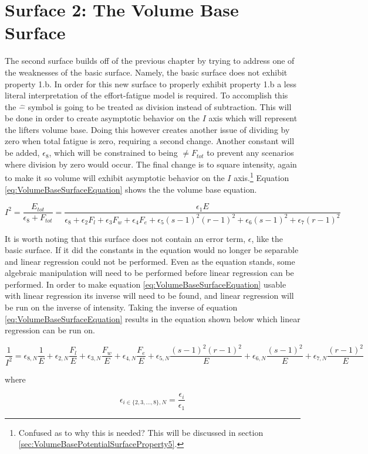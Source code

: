 \chapter{Surface 2: The Volume Base Surface}
\label{sec:PotentialSurfaceTheVolumeBaseSurface}

The second surface builds off of the previous chapter by trying to address one of the weaknesses of the basic surface. Namely, the basic surface does not exhibit property 1.b. In order for this new surface to properly exhibit property 1.b a less literal interpretation of the effort-fatigue model is required. To accomplish this the $\hat{-}$ symbol is going to be treated as division instead of subtraction. This will be done in order to create asymptotic behavior on the $I$ axis which will represent the lifters volume base. Doing this however creates another issue of dividing by zero when total fatigue is zero, requiring a second change. Another constant will be added, $\epsilon_8$, which will be constrained to being $\ne F_{tot}$ to prevent any scenarios where division by zero would occur. The final change is to square intensity, again to make it so volume will exhibit asymptotic behavior on the $I$ axis.\footnote{Confused as to why this is needed? This will be discussed in section \ref{sec:VolumeBasePotentialSurfaceProperty5}.} Equation \ref{eq:VolumeBaseSurfaceEquation} shows the the volume base equation.
 
\begin{equation}
	I^2 = \frac{E_{tot}}{\epsilon_8+F_{tot}}= \frac{
		\epsilon_1E
	}{
		\epsilon_8+
		\epsilon_2 F_l+
		\epsilon_3 F_w+
		\epsilon_4 F_e+
		\epsilon_5 (s-1)^2(r-1)^2+
		\epsilon_6 (s-1)^2+
		\epsilon_7 (r-1)^2
	}
	\label{eq:VolumeBaseSurfaceEquation}
\end{equation}

It is worth noting that this surface does not contain an error term, $\epsilon$, like the basic surface. If it did the constants in the equation would no longer be separable and linear regression could not be performed. Even as the equation stands, some algebraic manipulation will need to be performed before linear regression can be performed. In order to make equation \ref{eq:VolumeBaseSurfaceEquation} usable with linear regression its inverse will need to be found, and linear regression will be run on the inverse of intensity. Taking the inverse of equation \ref{eq:VolumeBaseSurfaceEquation} results in the equation shown below which linear regression can be run on.

\begin{minipage}{\textwidth}
	\begin{equation*}
		\frac{1}{I^2}=
			\epsilon_{8,N}\frac{1}{E}+
			\epsilon_{2,N}\frac{F_l}{E}+
			\epsilon_{3,N}\frac{F_w}{E}+
			\epsilon_{4,N}\frac{F_e}{E}+
			\epsilon_{5,N}\frac{(s-1)^2(r-1)^2}{E}+
			\epsilon_{6,N}\frac{(s-1)^2}{E}+
			\epsilon_{7,N}\frac{(r-1)^2}{E}
	\end{equation*}
	\centerline{where}
		\begin{equation*}
			\epsilon_{i\in\{2,3,...,8\},N}=
			\frac{\epsilon_i}{\epsilon_1}
	\end{equation*}
\end{minipage}

